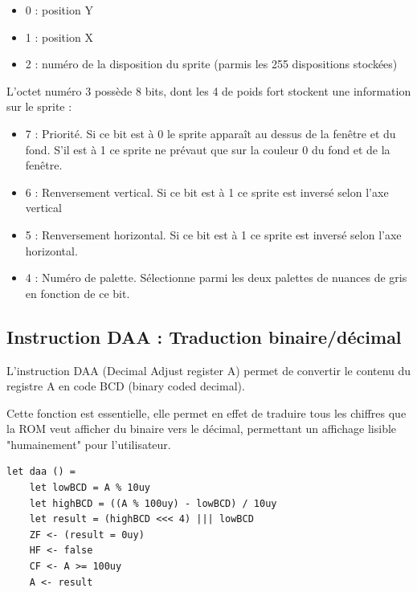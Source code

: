\documentclass[12pt, a4paper]{article}
\begin{document}
\bigskip
\begin{itemize}
    \item 0 : position Y
    \item 1 : position X
    \item 2 : numéro de la disposition du sprite (parmis les 255 dispositions stockées)
\end{itemize}

\bigskip
\pagebreak
L'octet numéro 3 possède 8 bits, dont les 4 de poids fort stockent une information sur le sprite :

\bigskip
\begin{itemize}
    \item 7 : Priorité. Si ce bit est à 0 le sprite apparaît au dessus de la fenêtre et du fond. S'il est à 1 ce sprite ne prévaut que sur la couleur 0 du fond et de la fenêtre.
    \item 6 : Renversement vertical. Si ce bit est à 1 ce sprite est inversé selon l'axe vertical
    \item 5 : Renversement horizontal. Si ce bit est à 1 ce sprite est inversé selon l'axe horizontal.
    \item 4 : Numéro de palette. Sélectionne parmi les deux palettes de nuances de gris en fonction de ce bit.  
\end{itemize}



\pagebreak

\subsection{Instruction DAA : Traduction binaire/décimal}

L'instruction DAA (Decimal Adjust register A) permet de convertir le contenu du registre A en code BCD (binary coded decimal).

\bigskip
Cette fonction est essentielle, elle permet en effet de traduire tous les chiffres que la ROM veut afficher du binaire vers le décimal, permettant un affichage lisible "humainement" pour l'utilisateur.

\bigskip

\small{\begin{lstlisting}[frame=single]
let daa () =
    let lowBCD = A % 10uy
    let highBCD = ((A % 100uy) - lowBCD) / 10uy
    let result = (highBCD <<< 4) ||| lowBCD
    ZF <- (result = 0uy)
    HF <- false
    CF <- A >= 100uy
    A <- result
\end{lstlisting}}
\end{document}
